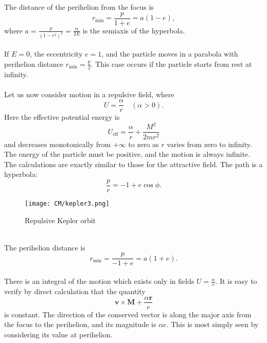 The distance of the perihelion from the focus is
\[r_{\mathrm{min}} = \frac{p}{1+e} = a(1-e),\]
where $a = \frac{p}{(1-e^2)^2} = \frac{\alpha}{2E}$ is the semiaxis of the hyperbola.
\\ \\
If $E = 0$, the eccentricity $e = 1$, and the particle moves in a parabola with perihelion distance $r_{\mathrm{min}} = \frac{p}{2}$. This case occurs if the particle starts from rest at infinity.
\\ \\
Let us now consider motion in a repulsive field, where
\[U= \frac{\alpha}{r} \quad (\alpha > 0).\]
Here the effective potential energy is
\[U_{\mathrm{eff}} = \frac{\alpha}{r} + \frac{M^2}{2mr^2} \]
and decreases monotonically from $+\infty$ to zero as $r$ varies from zero to infinity.
The energy of the particle must be positive, and the motion is always infinite. The calculations are exactly similar to those for the attractive field.
The path is a hyperbola:
\[\frac{p}{r} = -1 + e\cos\phi.\]
\begin{figure}[!h]
	\centering
	\texttt{[image: CM/kepler3.png]}
	\caption{Repulsive Kepler orbit}
\end{figure}
\\
The perihelion distance is
\[r_{\mathrm{min}} = \frac{p}{-1+e} = a(1+e).\]
\\
There is an integral of the motion which exists only in fields $U = \frac{\alpha}{r}$. 
It is easy to verify by direct calculation that the quantity
\[\bm{v}\times\bm{M} + \frac{\alpha \bm{r}}{r} \]
is constant. The direction of the conserved vector is along the major axis from the focus to the perihelion, and its magnitude is $\alpha e$. This is most simply seen by considering its value at perihelion.

